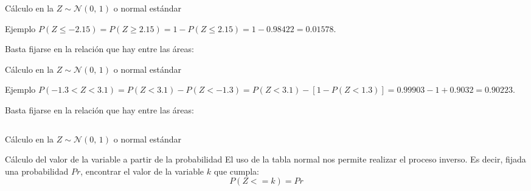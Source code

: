 \documentclass[11pt]{beamer}
\begin{document}
\begin{frame}{Cálculo en la $Z \sim \mathcal{N}(0,\,1)$ o normal estándar}
\begin{block}{Ejemplo}
$P\left(Z\leq -2.15 \right)=P\left(Z\geq 2.15 \right)=1-P\left(Z\leq 2.15 \right)=1-0.98422=0.01578$.
\end{block}
Basta fijarse en la relación que hay entre las áreas:
\begin{center}
    
\end{center}
\end{frame}

\begin{frame}{Cálculo en la $Z \sim \mathcal{N}(0,\,1)$ o normal estándar}
\begin{block}{Ejemplo}
$P\left( -1.3 < Z < 3.1\right)=P\left( Z < 3.1\right)-P\left(  Z < -1.3\right)=
    P\left( Z < 3.1\right) - \left[ 1 - P\left(  Z < 1.3\right) \right]= 0.99903 - 1 + 0.9032 = 0.90223$.
\end{block}
Basta fijarse en la relación que hay entre las áreas:
\begin{center}
    
\end{center}

\begin{columns}
\begin{column}{0.5\textwidth}
 
\end{column}
\begin{column}{0.5\textwidth}
 
\end{column}
\end{columns}
\end{frame}

\begin{frame}{Cálculo en la $Z \sim \mathcal{N}(0,\,1)$ o normal estándar}
\begin{block}{Cálculo del valor de la variable a partir de la probabilidad}
El uso de la tabla normal nos permite realizar el proceso inverso. Es decir, fijada una probabilidad $Pr$, encontrar el valor de la variable $k$ que cumpla:
$$P(Z<=k)=Pr$$
    \begin{center}
        
    \end{center}
\end{block}

\end{frame}
\end{document}
